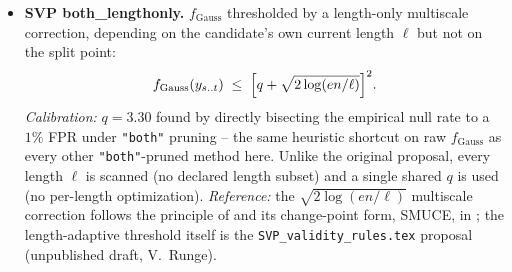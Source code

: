 \documentclass[11pt]{article}
\begin{document}
\begin{itemize}
\item \textbf{SVP both\_lengthonly.} $f_{\mathrm{Gauss}}$ thresholded by a
length-only multiscale correction, depending on the candidate's own
current length $\ell$ but not on the split point:
\[
f_{\mathrm{Gauss}}(y_{s..t}) \;\le\; \Bigl[q+\sqrt{2\log(en/\ell)}\Bigr]^2.
\]
\emph{Calibration:} $q=3.30$ found by directly bisecting the empirical
null rate to a $1\%$ FPR under \texttt{"both"} pruning -- the same
heuristic shortcut on raw $f_{\mathrm{Gauss}}$ as every other
\texttt{"both"}-pruned method here. Unlike the original proposal, every
length $\ell$ is scanned (no declared length subset) and a single shared
$q$ is used (no per-length optimization). \emph{Reference:} the
$\sqrt{2\log(en/\ell)}$ multiscale correction follows the principle of
\cite{dumbgen2001} and its change-point form, SMUCE, in \cite{frick2014};
the length-adaptive threshold itself is the
\texttt{SVP\_validity\_rules.tex} proposal (unpublished draft,
V.~Runge).


\end{itemize}
\end{document}
